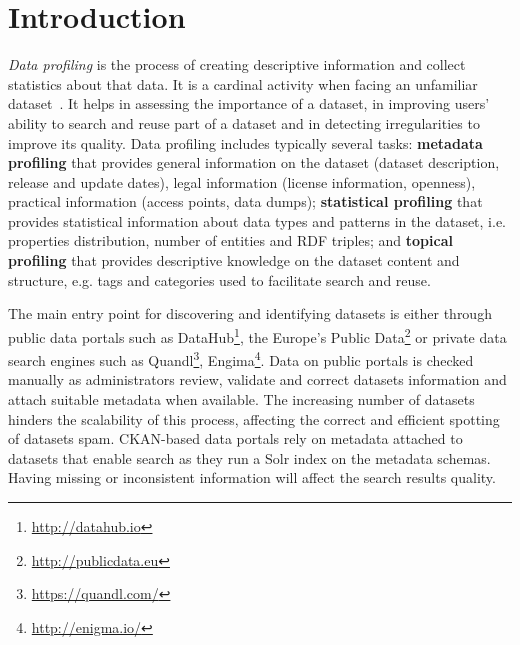 \documentclass{sig-alternate}
\begin{document}

\section{Introduction}
\label{sec:introduction}
\textit{Data profiling} is the process of creating descriptive information and collect statistics about that data. It is a cardinal activity when facing an unfamiliar dataset~\cite{semwebprofiling}. It helps in assessing the importance of a dataset, in improving users' ability to search and reuse part of a dataset and in detecting irregularities to improve its quality. Data profiling includes typically several tasks: \textbf{metadata profiling} that provides general information on the dataset (dataset description, release and update dates), legal information (license information, openness), practical information (access points, data dumps); \textbf{statistical profiling} that provides statistical information about data types and patterns in the dataset, i.e. properties distribution, number of entities and RDF triples; and \textbf{topical profiling} that provides descriptive knowledge on the dataset content and structure, e.g. tags and categories used to facilitate search and reuse.

The main entry point for discovering and identifying data\-sets is either through public data portals such as DataHub\footnote{\url{http://datahub.io}}, the Europe's Public Data\footnote{\url{http://publicdata.eu}} or private data search engines such as Quandl\footnote{\url{https://quandl.com/}}, Engima\footnote{\url{http://enigma.io/}}. Data on public portals is checked manually as administrators review, validate and correct datasets information and attach suitable metadata when available. The increasing number of datasets hinders the scalability of this process, affecting the correct and efficient spotting of datasets spam. CKAN-based data portals rely on metadata attached to datasets that enable search as they run a Solr index on the metadata schemas. Having missing or inconsistent information will affect the search results quality.
\end{document}
